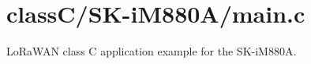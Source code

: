 \hypertarget{class_c_2_s_k-i_m880_a_2main_8c-example}{}\section{class\+C/\+S\+K-\/i\+M880\+A/main.\+c}
Lo\+Ra\+W\+AN class C application example for the S\+K-\/i\+M880A.


\begin{DoxyCodeInclude}
\end{DoxyCodeInclude}
 